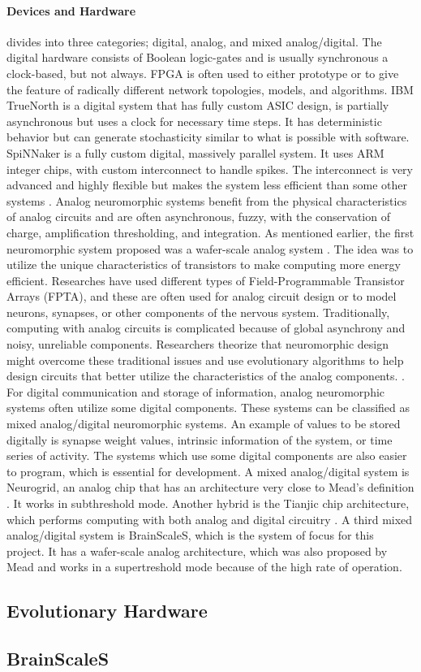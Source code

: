 \paragraph{Devices and Hardware} divides into three categories; digital, analog, and mixed analog/digital.
The digital hardware consists of Boolean logic-gates and is usually synchronous a clock-based, but not always.
FPGA is often used to either prototype or to give the feature of radically different network topologies, models, and algorithms.
IBM TrueNorth is a digital system that has fully custom ASIC design, is partially asynchronous but uses a clock for necessary time steps.
It has deterministic behavior but can generate stochasticity similar to what is possible with software.
SpiNNaker is a fully custom digital, massively parallel system.
It uses ARM integer chips, with custom interconnect to handle spikes.
The interconnect is very advanced and highly flexible but makes the system less efficient than some other systems \cite{furber_large-scale_2016} \cite{schuman_survey_2017}.
Analog neuromorphic systems benefit from the physical characteristics of analog circuits and are often asynchronous, fuzzy, with the conservation of charge, amplification thresholding, and integration.
As mentioned earlier, the first neuromorphic system proposed was a wafer-scale analog system \cite{mead_neuromorphic_1990}.
The idea was to utilize the unique characteristics of transistors to make computing more energy efficient.
Researches have used different types of Field-Programmable Transistor Arrays (FPTA), and these are often used for analog circuit design or to model neurons, synapses, or other components of the nervous system.
Traditionally, computing with analog circuits is complicated because of global asynchrony and noisy, unreliable components. Researchers theorize that neuromorphic design might overcome these traditional issues and use evolutionary algorithms to help design circuits that better utilize the characteristics of the analog components. \cite{langeheine_cmos_2001}.
For digital communication and storage of information, analog neuromorphic systems often utilize some digital components. These systems can be classified as mixed analog/digital neuromorphic systems.
An example of values to be stored digitally is synapse weight values, intrinsic information of the system, or time series of activity. The systems which use some digital components are also easier to program, which is essential for development.
A mixed analog/digital system is Neurogrid, an analog chip that has an architecture very close to Mead's definition \cite{mead_neuromorphic_1990}.
It works in subthreshold mode.
Another hybrid is the Tianjic chip architecture, which performs computing with both analog and digital circuitry \cite{pei_towards_2019}.
A third mixed analog/digital system is BrainScaleS, which is the system of focus for this project.
It has a wafer-scale analog architecture, which was also proposed by Mead \cite{mead_neuromorphic_1990} and works in a supertreshold mode because of the high rate of operation.
\cite{schuman_survey_2017}

\subsection{Evolutionary Hardware}\label{sect:eh}


\subsection{BrainScaleS}\label{sect:bss}


